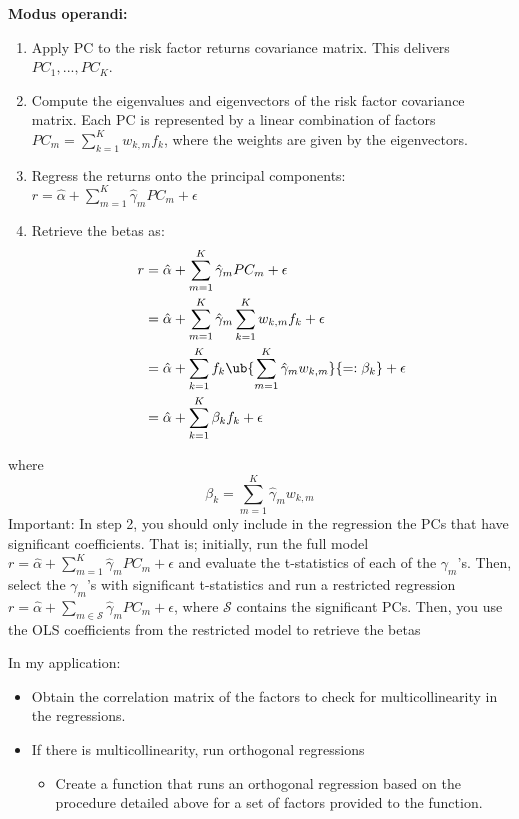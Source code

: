 \textbf{Modus operandi:}
\begin{enumerate}[noitemsep]
  \item Apply PC to the risk factor returns covariance matrix. This delivers $PC_1,..., PC_K$. 
  \item Compute the eigenvalues and eigenvectors of the risk factor covariance matrix. Each PC is represented by a linear combination of factors $PC_m= \sum_{k=1}^K w_{k,m} f_k$, where the weights are given by the eigenvectors.
  \item Regress the returns onto the principal components: $r = \hat \alpha + \sum_{m=1}^K \hat \gamma_m PC_m + \epsilon $
  \item Retrieve the betas as: 
\begin{align*}
r 
&= \hat \alpha + \sum_{m=1}^K \hat \gamma_m PC_m + \epsilon 
\\
&= \hat \alpha + \sum_{m=1}^K \hat \gamma_m \sum_{k=1}^K w_{k,m} f_k + \epsilon 
\\
&= \hat \alpha +  \sum_{k=1}^K f_k \ub{\sum_{m=1}^K \hat \gamma_m w_{k,m}}{=:\beta_k}  + \epsilon 
\\
&= \hat \alpha +  \sum_{k=1}^K \beta_k f_k  + \epsilon 
\end{align*}
\end{enumerate}
where
$$
\beta_k = \sum_{m=1}^K \hat \gamma_m w_{k,m}
$$
Important: In step 2, you should only include in the regression the PCs that have significant coefficients. That is; initially, run the full model $r = \hat \alpha + \sum_{m=1}^K \hat \gamma_m PC_m + \epsilon $ and evaluate the t-statistics of each of the $\gamma_m$'s. Then, select the $\gamma_m$'s with significant t-statistics and run a restricted regression $r = \hat \alpha + \sum_{m\in \mathcal S} \hat \gamma_m PC_m + \epsilon $, where $\mathcal S$ contains the significant PCs. Then, you use the OLS coefficients from the restricted model to retrieve the betas

In my application: 
\begin{itemize}[leftmargin=*,noitemsep]
  \item Obtain the correlation matrix of the factors to check for multicollinearity in the regressions.
  \item If there is multicollinearity, run orthogonal regressions
\begin{itemize}[leftmargin=*,noitemsep]
  \item Create a function that runs an orthogonal regression based on the procedure detailed above for a set of factors provided to the function.
\end{itemize}

\end{itemize}



